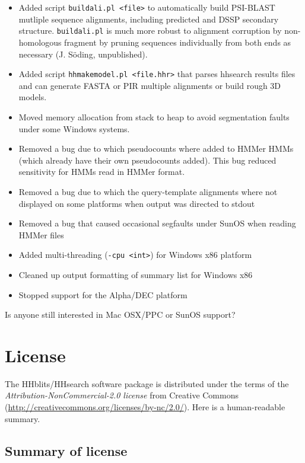 \documentclass[11pt,a4paper]{article}
\begin{document}
\begin{itemize}
\item{Added script \verb`buildali.pl <file>` to automatically build PSI-BLAST mutliple 
  sequence alignments, including predicted and DSSP secondary structure. 
  \verb`buildali.pl` is much more robust to alignment corruption by non-homologous fragment by
  pruning sequences individually from both ends as necessary (J. S\"oding, unpublished).
}
\item{Added script \verb`hhmakemodel.pl <file.hhr>` that parses hhsearch results files 
  and can generate FASTA or PIR multiple alignments or build rough 3D models.
}
\item{Moved memory allocation from stack to heap to avoid segmentation faults
  under some Windows systems.
}
\item{Removed a bug due to which pseudocounts where added to HMMer HMMs (which 
  already have their own pseudocounts added). This bug reduced sensitivity 
  for HMMs read in HMMer format.
}
\item{Removed a bug due to which the query-template alignments where not displayed
  on some platforms when output was directed to stdout
}
\item{Removed a bug that caused occasional segfaults under SunOS when reading HMMer files
}
\item{Added multi-threading (\verb`-cpu <int>`) for Windows x86 platform
}
\item{Cleaned up output formatting of summary list for Windows x86
}
\item{Stopped support for the Alpha/DEC platform
}
\end{itemize}

Is anyone still interested in Mac OSX/PPC or SunOS support? 


\section{License}

The HHblits/HHsearch software package is distributed under the terms of the \emph{Attribution-NonCommercial-2.0 license} from Creative Commons (\url{http://creativecommons.org/licenses/by-nc/2.0/}). Here is a human-readable summary.

\subsection*{Summary of license}
\end{document}
